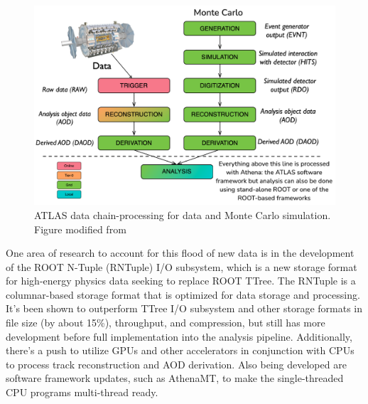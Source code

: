 \begin{figure}[ht]
    \centering
    \includegraphics[width=.8\textwidth]{content/img/modified-James-chain-processing.png}
    \caption{ATLAS data chain-processing for data and Monte Carlo simulation. Figure modified from \cite{James_Catmore_chain_processing}}
    \label{fig:intro_ATLAS_detector}
\end{figure}

One area of research to account for this flood of new data is in the development of the ROOT N-Tuple (RNTuple) I/O subsystem, which is a new storage format for high-energy physics data seeking to replace ROOT TTree. 
The RNTuple is a columnar-based storage format that is optimized for data storage and processing.
It's been shown to outperform TTree I/O subsystem and other storage formats in file size (by about 15\%), throughput, and compression, but still has more development before full implementation into the analysis pipeline.\cite{RNTuple_Lopez-Gomez_2023}\cite{RNTuple_Blomer}
Additionally, there's a push to utilize GPUs and other accelerators in conjunction with CPUs to process track reconstruction and AOD derivation.
Also being developed are software framework updates, such as AthenaMT, to make the single-threaded CPU programs multi-thread ready.\cite{AthenaMT_Leggett_2017}

